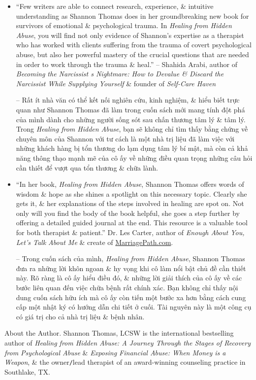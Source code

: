 \documentclass{article}
\begin{document}
\begin{enumerate}
\begin{itemize}
		\item ``Few writers are able to connect research, experience, \& intuitive understanding as {\sc Shannon Thomas} does in her groundbreaking new book for survivors of emotional \& psychological trauma. In {\it Healing from Hidden Abuse}, you will find not only evidence of {\sc Shannon}'s expertise as a therapist who has worked with clients suffering from the trauma of covert psychological abuse, but also her powerful mastery of the crucial questions that are needed in order to work through the trauma \& heal.'' -- {\sc Shahida Arabi}, author of {\it Becoming the Narcissist s Nightmare: How to Devalue \& Discard the Narcissist While Supplying Yourself} \& founder of {\it Self-Care Haven}
		
		-- Rất ít nhà văn có thể kết nối nghiên cứu, kinh nghiệm, \& hiểu biết trực quan như {\sc Shannon Thomas} đã làm trong cuốn sách mới mang tính đột phá của mình dành cho những người sống sót sau chấn thương tâm lý \& tâm lý. Trong {\it Healing from Hidden Abuse}, bạn sẽ không chỉ tìm thấy bằng chứng về chuyên môn của {\sc Shannon} với tư cách là một nhà trị liệu đã làm việc với những khách hàng bị tổn thương do lạm dụng tâm lý bí mật, mà còn cả khả năng thông thạo mạnh mẽ của cô ấy về những điều quan trọng những câu hỏi cần thiết để vượt qua tổn thương \& chữa lành.
		
		\item ``In her book, {\it Healing from Hidden Abuse}, {\sc Shannon Thomas} offers words of wisdom \& hope as she shines a spotlight on this necessary topic. Clearly she gets it, \& her explanations of the steps involved in healing are spot on. Not only will you find the body of the book helpful, she goes a step further by offering a detailed guided journal at the end. This resource is a valuable tool for both therapist \& patient.'' Dr. {\sc Les Carter}, author of {\it Enough About You, Let's Talk About Me} \& create of \url{MarriagePath.com}.
		
		-- Trong cuốn sách của mình, {\it Healing from Hidden Abuse}, {\sc Shannon Thomas} đưa ra những lời khôn ngoan \& hy vọng khi cô làm nổi bật chủ đề cần thiết này. Rõ ràng là cô ấy hiểu điều đó, \& những lời giải thích của cô ấy về các bước liên quan đến việc chữa bệnh rất chính xác. Bạn không chỉ thấy nội dung cuốn sách hữu ích mà cô ấy còn tiến một bước xa hơn bằng cách cung cấp một nhật ký có hướng dẫn chi tiết ở cuối. Tài nguyên này là một công cụ có giá trị cho cả nhà trị liệu \& bệnh nhân.
	\end{itemize}
	{\sf About the Author.} {\sc Shannon Thomas, LCSW} is the international bestselling author of {\it Healing from Hidden Abuse: A Journey Through the Stages of Recovery from Psychological Abuse} \& {\it Exposing Financial Abuse: When Money is a Weapon}, \& the owner{\tt/}lead therapist of an award-winning counseling practice in Southlake, TX.
	

\end{enumerate}
\end{document}
